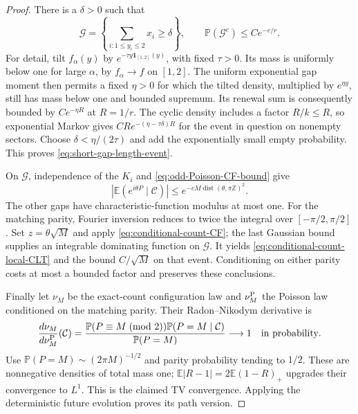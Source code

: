 \documentclass[11pt,letterpaper]{article}
\newcommand{\PP}{\mathbb P}\newcommand{\EE}{\mathbb E}
\newcommand{\ind}{\mathbf 1}\newcommand{\Exp}{\operatorname{Exp}}
\begin{document}
\begin{proof}
There is a $\delta>0$ such that
\begin{equation}\label{eq:short-gap-length-event}
 \mathcal G=\left\{\sum_{i:1\le y_i\le2}x_i\ge\delta\right\},
 \qquad \PP(\mathcal G^c)\le Ce^{-c/r}.
\end{equation}
For detail, tilt $f_\alpha(y)$ by
$e^{-\tau y\ind_{[1,2]}(y)}$, with fixed $\tau>0$.
Its mass is uniformly below one for large $\alpha$, by
$f_\alpha\to f$ on $[1,2]$. The uniform exponential gap moment
then permits a fixed $\eta>0$ for which the tilted density,
multiplied by $e^{\eta y}$, still has mass below one and bounded
supremum. Its renewal sum is consequently bounded by
$Ce^{-\eta R}$ at $R=1/r$. The cyclic density includes a factor
$R/k\le R$, so exponential Markov gives
$CR e^{-(\eta-\tau\delta)R}$ for the event in question on
nonempty sectors. Choose $\delta<\eta/(2\tau)$ and add the
exponentially small empty probability. This proves
\eqref{eq:short-gap-length-event}.

On $\mathcal G$, independence of the $K_i$ and
\eqref{eq:odd-Poisson-CF-bound} give
\[
 |\EE(e^{i\theta P}\mid\mathcal C)|
       \le e^{-cM\operatorname{dist}(\theta,\pi\mathbb Z)^2}.
\]
The other gaps have characteristic-function modulus at most one.
For the matching parity, Fourier inversion reduces to twice the
integral over $[-\pi/2,\pi/2]$. Set $z=\theta\sqrt M$ and apply
\eqref{eq:conditional-count-CF}; the last Gaussian bound supplies
an integrable dominating function on $\mathcal G$. It yields
\eqref{eq:conditional-count-local-CLT} and the bound
$C/\sqrt M$ on that event. Conditioning on either parity costs
at most a bounded factor and preserves these conclusions.

Finally let $\nu_M$ be the exact-count configuration law and
$\nu_M^{\rm P}$ the Poisson law conditioned on the matching parity.
Their Radon--Nikodym derivative is
\begin{equation}\label{eq:mesoscopic-count-density-ratio}
 \frac{d\nu_M}{d\nu_M^{\rm P}}(\mathcal C)
  =\frac{\PP(P\equiv M\!\pmod2)\PP(P=M\mid\mathcal C)}
               {\PP(P=M)}\longrightarrow1
                                      \quad\hbox{in probability}.
\end{equation}
Use $\PP(P=M)\sim(2\pi M)^{-1/2}$ and parity probability tending
to $1/2$. These are nonnegative densities of total mass one;
$\EE|R-1|=2\EE(1-R)_+$ upgrades their convergence to $L^1$.
This is the claimed TV convergence. Applying the deterministic
future evolution proves its path version.
\end{proof}
\end{document}
